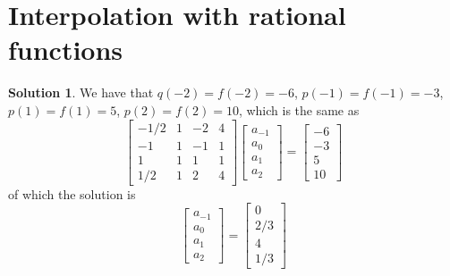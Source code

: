 \documentclass{article}
\theoremstyle{definition}
\newtheorem{solution}{Solution}
\begin{document}
\section{Interpolation with rational functions}
\begin{solution}
  We have that $q(-2)=f(-2)=-6$, $p(-1)=f(-1)=-3$, $p(1)=f(1)=5$, $p(2)=f(2)=10$, which is the same as
  \begin{equation}
    \begin{bmatrix}
      -1/2& 1& -2& 4\\
      -1& 1& -1& 1\\
      1 & 1 & 1& 1\\
      1/2& 1 & 2 & 4
    \end{bmatrix}\begin{bmatrix}
      a_{-1}\\
      a_0\\
      a_1\\
      a_2
    \end{bmatrix}=\begin{bmatrix}
      -6\\
      -3\\
      5\\
      10
    \end{bmatrix}
  \end{equation}
  of which the solution is 
  \begin{equation}
    \begin{bmatrix}
      a_{-1}\\
      a_0\\
      a_1\\
      a_2
    \end{bmatrix}=\begin{bmatrix}
      0\\
      2/3\\
      4\\
      1/3
    \end{bmatrix}
  \end{equation}
\end{solution}
\end{document}
